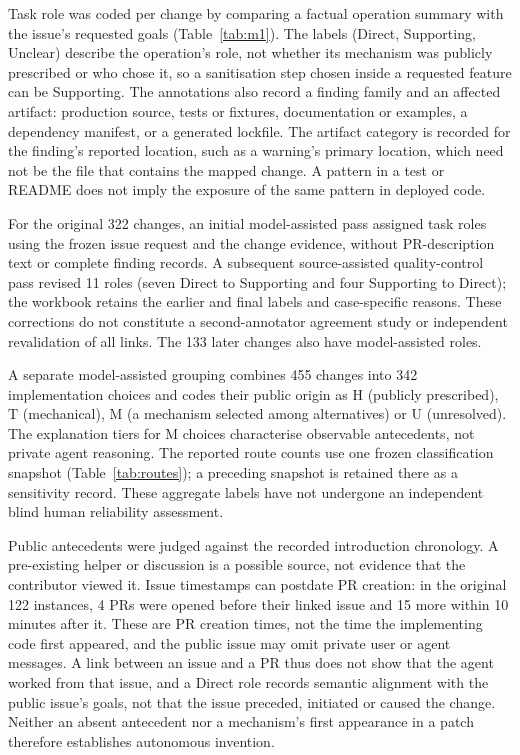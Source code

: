\documentclass[acmsmall,screen,nonacm]{acmart}
\begin{document}
Task role was coded per change by comparing a factual operation summary with the issue's requested goals (Table~\ref{tab:m1}). The labels (Direct, Supporting, Unclear) describe the operation's role, not whether its mechanism was publicly prescribed or who chose it, so a sanitisation step chosen inside a requested feature can be Supporting. The annotations also record a finding family and an affected artifact: production source, tests or fixtures, documentation or examples, a dependency manifest, or a generated lockfile. The artifact category is recorded for the finding's reported location, such as a warning's primary location, which need not be the file that contains the mapped change. A pattern in a test or README does not imply the exposure of the same pattern in deployed code.

For the original 322 changes, an initial model-assisted pass assigned task roles using the frozen issue request and the change evidence, without PR-description text or complete finding records. A subsequent source-assisted quality-control pass revised 11 roles (seven Direct to Supporting and four Supporting to Direct); the workbook retains the earlier and final labels and case-specific reasons. These corrections do not constitute a second-annotator agreement study or independent revalidation of all links. The 133 later changes also have model-assisted roles.

A separate model-assisted grouping combines 455 changes into 342 implementation choices and codes their public origin as H (publicly prescribed), T (mechanical), M (a mechanism selected among alternatives) or U (unresolved). The explanation tiers for M choices characterise observable antecedents, not private agent reasoning. The reported route counts use one frozen classification snapshot (Table~\ref{tab:routes}); a preceding snapshot is retained there as a sensitivity record. These aggregate labels have not undergone an independent blind human reliability assessment.

Public antecedents were judged against the recorded introduction chronology. A pre-existing helper or discussion is a possible source, not evidence that the contributor viewed it. Issue timestamps can postdate PR creation: in the original 122 instances, 4 PRs were opened before their linked issue and 15 more within 10 minutes after it. These are PR creation times, not the time the implementing code first appeared, and the public issue may omit private user or agent messages. A link between an issue and a PR thus does not show that the agent worked from that issue, and a Direct role records semantic alignment with the public issue's goals, not that the issue preceded, initiated or caused the change. Neither an absent antecedent nor a mechanism's first appearance in a patch therefore establishes autonomous invention.
\end{document}
